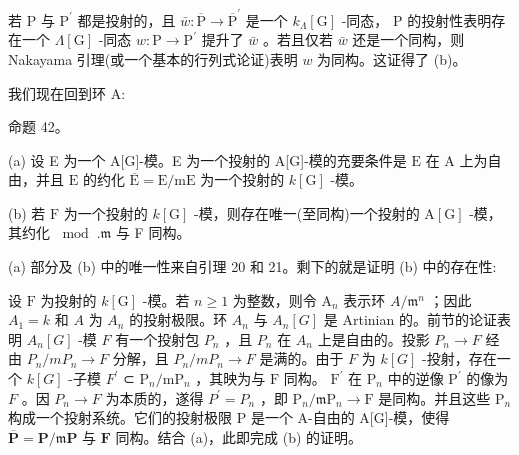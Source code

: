 \documentclass[10pt]{article}
\begin{document}
若 \(\mathrm{P}\) 与 \({\mathrm{P}}^{\prime }\) 都是投射的，且 \(\bar{w} : \overline{\mathrm{P}} \rightarrow  {\overline{\mathrm{P}}}^{\prime }\) 是一个 \({k}_{\Lambda }\left\lbrack  \mathrm{G}\right\rbrack\) -同态， \(\mathrm{P}\) 的投射性表明存在一个 \(\Lambda \left\lbrack  \mathrm{G}\right\rbrack\) -同态 \(w : \mathrm{P} \rightarrow  {\mathrm{P}}^{\prime }\) 提升了 \(\bar{w}\) 。若且仅若 \(\bar{w}\) 还是一个同构，则 Nakayama 引理(或一个基本的行列式论证)表明 \(w\) 为同构。这证得了 (b)。

我们现在回到环 A:

命题 42。

(a) 设 E 为一个 A[G]-模。E 为一个投射的 A[G]-模的充要条件是 \(\mathrm{E}\) 在 \(\mathrm{A}\) 上为自由，并且 \(\mathrm{E}\) 的约化 \(\overline{\mathrm{E}} = \mathrm{E}/\mathrm{{mE}}\) 为一个投射的 \(k\left\lbrack  \mathrm{G}\right\rbrack\) -模。

(b) 若 \(\mathrm{F}\) 为一个投射的 \(k\left\lbrack  \mathrm{G}\right\rbrack\) -模，则存在唯一(至同构)一个投射的 \(\mathrm{A}\left\lbrack  \mathrm{G}\right\rbrack\) -模，其约化 \({\;\operatorname{mod}\;.}\mathfrak{m}\) 与 F 同构。

(a) 部分及 (b) 中的唯一性来自引理 20 和 21。剩下的就是证明 (b) 中的存在性:

设 \(\mathrm{F}\) 为投射的 \(k\left\lbrack  \mathrm{G}\right\rbrack\) -模。若 \(n \geq  1\) 为整数，则令 \({\mathrm{A}}_{n}\) 表示环 \(A/{\mathfrak{m}}^{n}\) ；因此 \({A}_{1} = k\) 和 \(A\) 为 \({A}_{n}\) 的投射极限。环 \({A}_{n}\) 与 \({A}_{n}\left\lbrack  G\right\rbrack\) 是 Artinian 的。前节的论证表明 \({A}_{n}\left\lbrack  G\right\rbrack\) -模 \(F\) 有一个投射包 \({P}_{n}\) ，且 \({P}_{n}\) 在 \({A}_{n}\) 上是自由的。投影 \({P}_{n} \rightarrow  F\) 经由 \({P}_{n}/m{P}_{n} \rightarrow  F\) 分解，且 \({P}_{n}/m{P}_{n} \rightarrow  F\) 是满的。由于 \(F\) 为 \(k\left\lbrack  G\right\rbrack\) -投射，存在一个 \(k\left\lbrack  G\right\rbrack\) -子模 \({F}^{\prime }\) ⊂ \({\mathrm{P}}_{n}/\mathrm{m}{\mathrm{P}}_{n}\) ，其映为与 \(\mathrm{F}\) 同构。 \({\mathrm{F}}^{\prime }\) 在 \({\mathrm{P}}_{n}\) 中的逆像 \({\mathrm{P}}^{\prime }\) 的像为 \(F\) 。因 \({P}_{n} \rightarrow  F\) 为本质的，遂得 \({P}^{\prime } = {P}_{n}\) ，即 \({\mathrm{P}}_{n}/\mathfrak{m}{\mathrm{P}}_{n} \rightarrow  \mathrm{F}\) 是同构。并且这些 \({\mathrm{P}}_{n}\) 构成一个投射系统。它们的投射极限 \(\mathrm{P}\) 是一个 A-自由的 A[G]-模，使得 \(\overline{\mathbf{P}} = \mathbf{P}/\mathfrak{m}\mathbf{P}\) 与 \(\mathbf{F}\) 同构。结合 (a)，此即完成 (b) 的证明。
\end{document}
